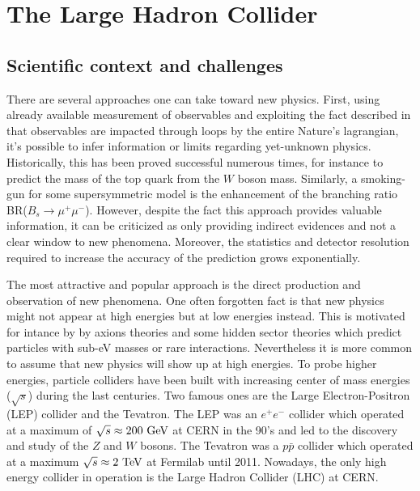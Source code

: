 


    \section{The Large Hadron Collider}

    \subsection{Scientific context and challenges}

    There are several approaches one can take toward new physics. First, using already
    available measurement of observables and exploiting the fact described in 
    that observables are impacted through loops by the entire Nature's lagrangian,
    it's possible to infer information or limits regarding yet-unknown physics. Historically,
    this has been proved successful numerous times, for instance to predict the
    mass of the top quark from the $W$ boson mass. Similarly, a smoking-gun for some
    supersymmetric model is the enhancement of the branching ratio BR($B_s \rightarrow \mu^+\mu^-$).
    However, despite the fact this approach provides valuable information, it can
    be criticized as only providing indirect evidences and not a clear window to new phenomena.
    Moreover, the statistics and detector resolution required to increase the accuracy
    of the prediction grows exponentially.

    The most attractive and popular approach is the direct production and observation of
    new phenomena. One often forgotten fact is that new physics might not appear at high
    energies but at low energies instead. This is motivated for intance by by axions
    theories and some hidden sector theories which predict particles with sub-eV masses
    or rare interactions. Nevertheless it is more common to assume that new physics will
    show up at high energies. To probe higher energies, particle colliders have been
    built with increasing center of mass energies ($\sqrt{s}$) during the last centuries.
    Two famous ones are the Large Electron-Positron (LEP) collider and the Tevatron. The
    LEP was an $e^+e^-$ collider which operated at a maximum of $\sqrt{s} \approx 200~\text{GeV}$
    at CERN in the 90's and led to the discovery and study of the $Z$ and $W$ bosons. The
    Tevatron was a $p\bar{p}$ collider which operated at a maximum $\sqrt{s} \approx 2~\text{TeV}$
    at Fermilab until 2011. Nowadays, the only high energy collider in operation is the
    Large Hadron Collider (LHC) at CERN.

